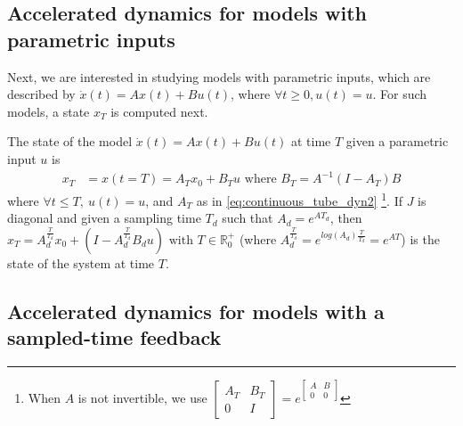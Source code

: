 \documentclass[sigconf]{llncs}
\newcommand{\mat}[1]{{#1}}
\renewcommand{\vec}[1]{{#1}}
\begin{document}
 \subsection{Accelerated dynamics for models with parametric inputs}\label{sec:real_discrete_param_inputs}
 Next, we are interested in studying models with parametric inputs, 
 which are described by $\dot{\vec{x}}(t)=\mat{A}\vec{x}(t)+\mat{B}\vec{u}(t)$, where $\forall t\geq 0, \vec{u}(t)=\vec{u}$. 
 For such models, a state $\vec{x}_T$ is computed next.
\begin{lemma}
The state of the model $\dot{\vec{x}}(t)=\mat{A}\vec{x}(t)+\mat{B}\vec{u}(t)$ at time $T$ given a parametric input $\vec{u}$ is 
 \begin{align}
 \vec{x}_T&=\vec{x}(t=T)=\mat{A}_T\vec{x}_0 + \mat{B}_T\vec{u} \text{ where } \mat{B}_T=\mat{A}^{-1}(\mat{I}-\mat{A}_T)\mat{B} 
 \label{eq:continuous_tube_param}
 \end{align}
 where $\forall t \leq T,\ \vec{u}(t)=\vec{u}$, and $\mat{A}_T$ as in \eqref{eq:continuous_tube_dyn2}
 \footnote{When $\mat{A}$ is not invertible, we use $\left[\begin{array}{cc}\mat{A}_T&\mat{B}_T\\ 0&\mat{I}\end{array}\right]=e^{\left[\begin{array}{cc}\mat{A}&\mat{B}\\0&0\end{array}\right]}$}.
 If $\mat{J}$ is diagonal and given a sampling time $T_d$ such that $A_d=e^{\mat{A} T_d}$, 
 then $\vec{x}_T=A_d^{\frac{T}{T_d}}\vec{x}_0+(\mat{I}-\mat{A}_d^{\frac{T}{T_d}}\mat{B}_d\vec{u}) \text{ with } T \in \mathbb{R}_0^+$ (where $\mat{A}_d^{\frac{T}{T_d}} = e^{log(\mat{A}_d) \frac{T}{T_d}} = e^{\mat{A} T}$) is the state of the system at time $T$.
 \end{lemma}

 \subsection{Accelerated dynamics for models with a sampled-time feedback}\label{sec:real_discrete_feedback_inputs}
\end{document}
